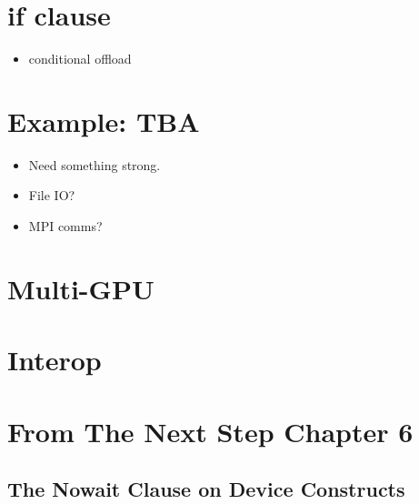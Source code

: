 \section{if clause}
\label{sec:if_clause}
\begin{itemize}
  \item conditional offload
\end{itemize}

\section{Example: TBA}
\begin{itemize}
  \item Need something strong.
  \item File IO?
  \item MPI comms?
\end{itemize}

\section{Multi-GPU}
\label{sec:multi_gpu}

\section{Interop}
\label{sec:interop}

\section{From The Next Step Chapter 6}

\subsection{The Nowait Clause on Device Constructs}
\label{sec:06.async-exec}



